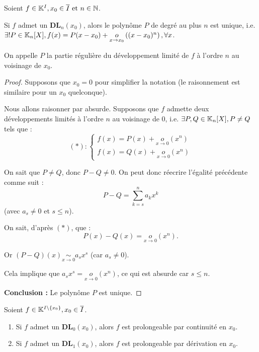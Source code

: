 \documentclass[12pt, a4paper]{report}
\begin{document}
\begin{property}
    Soient $f\in\mathbb{K}^I,x_0\in\overline{I} \text{ et } n\in\mathbb{N}$.

    Si $f$ admet un $\mathbf{DL}_n(x_0)$, alors le polynôme $P$ de degré au plus $n$ est unique, i.e. $\exists! P \in \mathbb{K}_n[X], f(x) = P(x-x_0) + \underset{x\to x_0}{o}\left((x-x_0)^n\right),\forall x$.

    On appelle $P$ la partie régulière du développement limité de $f$ à l'ordre $n$ au voisinage de $x_0$.
\end{property}

\begin{proof}
    Supposons que $x_0 = 0$ pour simplifier la notation (le raisonnement est similaire pour un $x_0$ quelconque). 
    
    Nous allons raisonner par absurde. Supposons que $f$ admette deux développements limités à l'ordre $n$ au voisinage de $0$, i.e. $\exists P,Q \in \mathbb{K}_n[X], P \ne Q$ tels que :
    $$(*):\begin{cases}
        f(x) = P(x) + \underset{x\to 0}{o}(x^n)\\
        f(x) = Q(x) + \underset{x\to 0}{o}(x^n)
    \end{cases}$$

    On sait que $P\ne Q$, donc $P-Q \ne 0$. On peut donc réecrire l'égalité précédente comme suit :
    $$P-Q=\sum_{k=s}^{n}a_kx^k$$
    (avec $a_s \ne 0$ et $s \le n$).

    On sait, d'après $(*)$, que :
    $$P(x) - Q(x) = \underset{x\to 0}{o}(x^n).$$

    Or $(P-Q)(x) \underset{x\to 0}{\sim} a_s x^s$ (car $a_s \ne 0$).

    Cela implique que $a_s x^s = \underset{x\to 0}{o}(x^n)$, ce qui est absurde car $s\le n$.

    \textbf{Conclusion :} Le polynôme $P$ est unique.
\end{proof}

\begin{property}
    Soient $f\in\mathbb{K}^{I\setminus\{x_0\}}, x_0 \in \overline{I}$.

    \begin{enumerate}
        \item Si $f$ admet un $\mathbf{DL}_0(x_0)$, alors $f$ est prolongeable par continuité en $x_0$.
        \item Si $f$ admet un $\mathbf{DL}_1(x_0)$, alors $f$ est prolongeable par dérivation en $x_0$.
    \end{enumerate}
\end{property}
\end{document}
